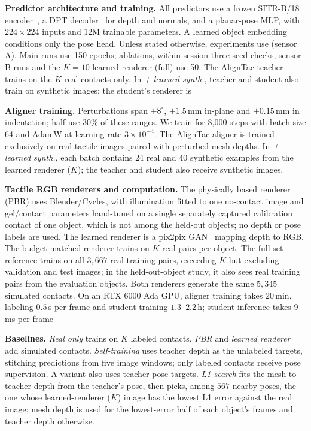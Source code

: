 \noindent\textbf{Predictor architecture and training.} All predictors use a frozen SITR-B/18 encoder~\cite{gupta2025sitr}, a DPT decoder~\cite{ranftl2021dpt} for depth and normals, and a planar-pose MLP, with $224\times224$ inputs and $12$M trainable parameters. A learned object embedding conditions only the pose head. Unless stated otherwise, experiments use \sensor{} (sensor A). Main runs use 150 epochs; ablations, within-session three-seed checks, sensor-B runs and the $K=10$ learned renderer (full) use 50. The AlignTac teacher trains on the $K$ real contacts only. In \emph{+ learned synth.}, teacher and student also train on synthetic images; the student's renderer is 

\noindent\textbf{Aligner training.} Perturbations span $\pm8^\circ$, $\pm1.5\,$mm in-plane and $\pm0.15\,$mm in indentation; half use $30\%$ of these ranges. We train for 8,000 steps with batch size 64 and AdamW at learning rate $3\times10^{-4}$. The AlignTac aligner is trained exclusively on real tactile images paired with perturbed mesh depths. In \emph{+ learned synth.}, each batch contains 24 real and 40 synthetic examples from the learned renderer ($K$); the teacher and student also receive synthetic images.


\noindent\textbf{Tactile RGB renderers and computation.} The physically based renderer (PBR) uses Blender/Cycles, with illumination fitted to one no-contact image and gel/contact parameters hand-tuned on a single separately captured calibration contact of one object, which is not among the held-out objects; no depth or pose labels are used. The learned renderer is a pix2pix GAN~\cite{isola2017pix2pix} mapping depth to RGB. The budget-matched renderer trains on $K$ real pairs per object. The full-set reference trains on all $3{,}667$ real training pairs, exceeding $K$ but excluding validation and test images; in the held-out-object study, it also sees real training pairs from the evaluation objects. Both renderers generate the same $5{,}345$ simulated contacts. On an RTX 6000 Ada GPU, aligner training takes $20$\,min, labeling $0.5\,$s per frame and student training $1.3$--$2.2$\,h; student inference takes $9$\,ms per frame 

\noindent\textbf{Baselines.} \emph{Real only} trains on $K$ labeled contacts. \emph{PBR} and \emph{learned renderer} add simulated contacts. \emph{Self-training} uses teacher depth as the unlabeled targets, stitching predictions from five image windows; only labeled contacts receive pose supervision. A variant also uses teacher pose targets. \emph{L1 search} fits the mesh to teacher depth from the teacher's pose, then picks, among $567$ nearby poses, the one whose learned-renderer ($K$) image has the lowest L1 error against the real image; mesh depth is used for the lowest-error half of each object's frames and teacher depth otherwise.

